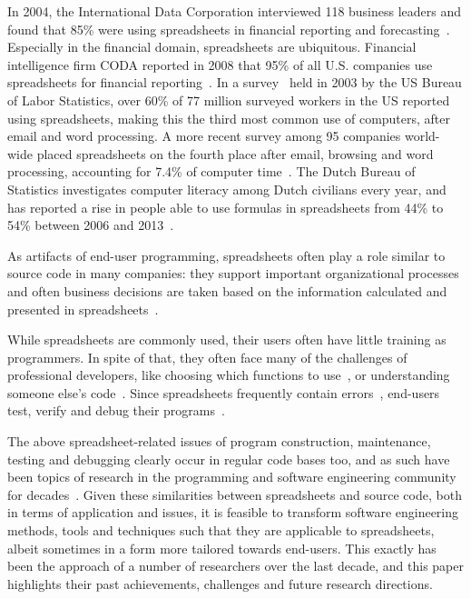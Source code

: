\documentclass[conference]{IEEEtran}
\begin{document}
In 2004, the International Data Corporation interviewed 118 business leaders and found that 85\% were using spreadsheets in financial reporting and forecasting~\cite{Panko2008}. Especially in the financial domain, spreadsheets are ubiquitous. Financial intelligence firm CODA reported in 2008 that 95\% of all U.S. companies use spreadsheets for financial reporting~\cite{Panko2008}. In a survey~\cite{BLS2003} held in 2003 by the US Bureau of Labor Statistics, over 60\% of 77 million surveyed workers in the US reported using spreadsheets, making this the third most common use of computers, after email and word processing. A more recent survey among 95 companies world-wide placed spreadsheets on the fourth place after email, browsing and word processing, accounting for 7.4\% of computer time~\cite{Wellnomics2007}. The Dutch Bureau of Statistics investigates computer literacy among Dutch civilians every year, and has reported a rise in people able to use formulas in spreadsheets from 44\% to 54\% between 2006 and 2013~\cite{CBS2013}.

As artifacts of end-user programming, spreadsheets often play a role similar to source code in many companies: they support important organizational processes and often business decisions are taken based on the information calculated and presented in spreadsheets~\cite{hermans_supporting_2011}.

While spreadsheets are commonly used, their users often have little training as programmers. In spite of that, they often face many of the challenges of professional developers, like choosing which functions to use~\cite{Ko2004}, or understanding someone else's code~\cite{Ko2011}. Since spreadsheets frequently contain errors~\cite{Panko1998}, end-users test, verify and debug their programs~\cite{Hermans2013-Cascon,Ko2004-Why}.

The above spreadsheet-related issues of program construction, maintenance, testing and debugging clearly occur in regular code bases too, and as such have been topics of research in the programming and software engineering community for decades~\cite{Ko2011}. Given these similarities between spreadsheets and source code, both in terms of application and issues, it is feasible to transform software engineering methods, tools and techniques such that they are applicable to spreadsheets, albeit sometimes in a form more tailored towards end-users. This exactly has been the approach of a number of researchers over the last decade, and this paper highlights their past achievements, challenges and future research directions. 
\end{document}
